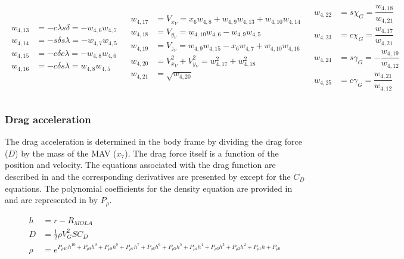 \begin{align} \label{eq:VV}
\begin{split}
w_{4,13} &= -c\lambda s\delta  = -w_{4,6}w_{4,7} \\
w_{4,14} &= -s\delta s\lambda = -w_{4,7}w_{4,5} \\
w_{4,15} &= -c\delta c\lambda = -w_{4,8}w_{4,6} \\
w_{4,16} &= -c\delta s\lambda = w_{4,8}w_{4,5} \\
\end{split}
&
\begin{split}
w_{4,17} &= V_{x_{V}} = x_{6}w_{4,8}+w_{4,9}w_{4,13}+w_{4,10}w_{4,14} \\
w_{4,18} &= V_{y_{V}} = w_{4,10}w_{4,6}-w_{4,9}w_{4,5} \\
w_{4,19} &= V_{z_{V}} = w_{4,9}w_{4,15}-x_{6}w_{4,7}+w_{4,10}w_{4,16} \\
w_{4,20} &= V_{x_{V}}^{2}+V_{y_{V}}^{2} = w_{4,17}^{2}+w_{4,18}^{2} \\
w_{4,21} &= \sqrt{w_{4,20}} \\
\end{split}
&
\begin{split}
w_{4,22} &= s\chi_{G} = \dfrac{w_{4,18}}{w_{4,21}} \\
w_{4,23} &= c\chi_{G} = \dfrac{w_{4,17}}{w_{4,21}} \\
w_{4,24} &= s\gamma_{G} = -\dfrac{w_{4,19}}{w_{4,12}} \\
w_{4,25} &= c\gamma_{G} = \dfrac{w_{4,21}}{w_{4,12}} \\
\end{split}
\end{align}



 \subsubsection{Drag acceleration}
 \label{subsubsec:tsiDrag}
The drag acceleration is determined in the body frame by dividing the drag force ($D$) by the mass of the \ac{MAV} ($x_{7}$). The drag force itself is a function of the position and velocity. The equations associated with the drag function are described in  and the corresponding derivatives are presented by  except for the $C_{D}$ equations. The polynomial coefficients for the density equation are provided in  and are represented in  by $P_{\rho}$.

 \begin{equation} \label{eq:dragAux}
\begin{split}
h &= r-R_{MOLA} \\
D &= \frac{1}{2}\rho V_{G}^{2}SC_{D}\\
\rho &= e^{P_{\rho 10}h^{10}+P_{\rho 9}h^{9}+P_{\rho 8}h^{8}+P_{\rho 7}h^{7}+P_{\rho 6}h^{6}+P_{\rho 5}h^{5}+P_{\rho 4}h^{4}+P_{\rho 3}h^{3}+P_{\rho 2}h^{2}+P_{\rho 1}h+P_{\rho 0}} \\
\end{split}
\end{equation}

